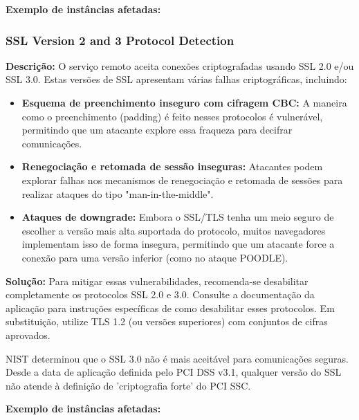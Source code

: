 \documentclass[a4paper,12pt]{article}
\begin{document}
\textbf{Exemplo de instâncias afetadas:}
\begin{itemize}
\end{itemize}

\subsubsection{SSL Version 2 and 3 Protocol Detection}

\textbf{Descrição:}  
O serviço remoto aceita conexões criptografadas usando SSL 2.0 e/ou SSL 3.0. Estas versões de SSL apresentam várias falhas criptográficas, incluindo:

\begin{itemize}
  \item \textbf{Esquema de preenchimento inseguro com cifragem CBC:}  
  A maneira como o preenchimento (padding) é feito nesses protocolos é vulnerável, permitindo que um atacante explore essa fraqueza para decifrar comunicações.
  
  \item \textbf{Renegociação e retomada de sessão inseguras:}  
  Atacantes podem explorar falhas nos mecanismos de renegociação e retomada de sessões para realizar ataques do tipo "man-in-the-middle".

  \item \textbf{Ataques de downgrade:}  
  Embora o SSL/TLS tenha um meio seguro de escolher a versão mais alta suportada do protocolo, muitos navegadores implementam isso de forma insegura, permitindo que um atacante force a conexão para uma versão inferior (como no ataque POODLE).
\end{itemize}

\textbf{Solução:}  
Para mitigar essas vulnerabilidades, recomenda-se desabilitar completamente os protocolos SSL 2.0 e 3.0. Consulte a documentação da aplicação para instruções específicas de como desabilitar esses protocolos. Em substituição, utilize TLS 1.2 (ou versões superiores) com conjuntos de cifras aprovados.

NIST determinou que o SSL 3.0 não é mais aceitável para comunicações seguras. Desde a data de aplicação definida pelo PCI DSS v3.1, qualquer versão do SSL não atende à definição de 'criptografia forte' do PCI SSC.

\textbf{Exemplo de instâncias afetadas:}
\begin{itemize}
\end{itemize}
\end{document}
